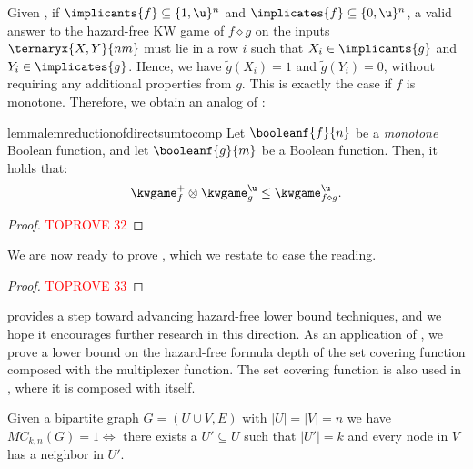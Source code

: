 \documentclass[acmsmall, nonacm, authorversion]{acmart}
\begin{document}
Given , if $\implicants{f} \subseteq \{1,\u\}^n$ and $\implicates{f} \subseteq \{0,\u\}^n$, a valid answer to the hazard-free KW game of $f\diamond g$ on the inputs $\ternaryx{X,Y}{n m}$ must lie in a row $i$ such that $X_i\in \implicants{g}$ and $Y_i \in \implicates{g}$. Hence, we have $\tilde{g}(X_i)=1$ and $\tilde{g}(Y_i)=0$, without requiring any additional properties from $g$. 
This is exactly the case if $f$ is monotone. Therefore, we obtain an analog of \cite[Lemma 4]{KRW95}:
\begin{restatable}{lemma}{lemreductionofdirectsumtocomp}\label{lemma:reduction-of-direct-sum-to-comp}
    Let $\booleanf{f}{n}$ be a \emph{monotone} Boolean function, and let $\booleanf{g}{m}$ be a Boolean function. Then, it holds that:
    \[
    \kwgame_{f}^{+} \otimes \kwgame_{g}^{\u}\le \kwgame_{f\diamond g}^\u.
    \]
\end{restatable}

\begin{proof}\textcolor{red}{TOPROVE 32}\end{proof}

We are now ready to prove , which we restate to ease the reading.

\proplowerboundviadirectsum*
\begin{proof}\textcolor{red}{TOPROVE 33}\end{proof}

 provides a step toward advancing hazard-free lower bound techniques, and we hope it encourages further research in this direction. As an application of , we prove a lower bound on the hazard-free formula depth of the set covering function composed with the multiplexer function. The set covering function is also used in \cite[Theorem 13]{KRW95}, where it is composed with itself.
\begin{definition}\label{def:set-covering}
Given a bipartite graph $G=(U\cup V,E)$ with $|U|=|V|=n$ we have $MC_{k,n}(G)=1 \iff$ there exists a $U'\subseteq U$ such that $|U'|=k$ and every node in $V$ has a neighbor in $U'$.
\end{definition}
\end{document}
